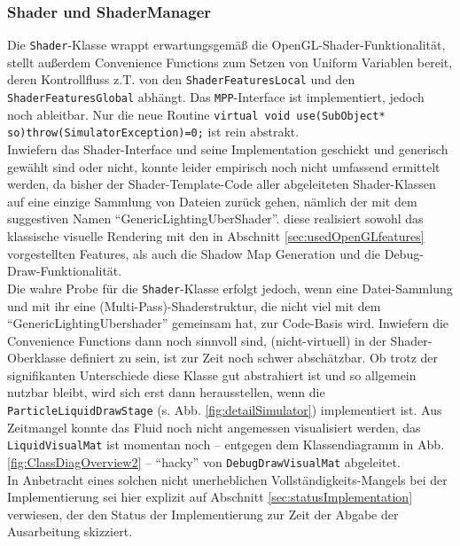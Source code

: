 	
	\subsubsection{Shader und ShaderManager}
	\label{sec:Shader}
		
		Die \lstinline|Shader|-Klasse wrappt erwartungsgemäß die OpenGL-Shader-Funktionalität,
		stellt außerdem Convenience Functions zum Setzen von Uniform Variablen bereit, deren Kontrollfluss
		z.T. von den \lstinline|ShaderFeaturesLocal| und den \lstinline|ShaderFeaturesGlobal| abhängt.
		Das \lstinline|MPP|-Interface ist implementiert, jedoch noch ableitbar.
		Nur die neue Routine  \lstinline|virtual void use(SubObject* so)throw(SimulatorException)=0;|
		ist rein abstrakt.\\
		
		Inwiefern das Shader-Interface und seine Implementation geschickt und generisch gewählt sind
		oder nicht, konnte leider empirisch noch nicht umfassend ermittelt werden, da bisher der
		Shader-Template-Code aller abgeleiteten
		Shader-Klassen auf eine einzige Sammlung von Dateien zurück gehen, nämlich der mit dem suggestiven Namen
		"`GenericLightingUberShader"'. diese realisiert sowohl das klassische visuelle Rendering mit den in Abschnitt
		\ref{sec:usedOpenGLfeatures} vorgestellten Features, als auch die Shadow Map Generation und die
		Debug-Draw-Funktionalität.\\
		Die wahre Probe für die \lstinline|Shader|-Klasse erfolgt jedoch, wenn eine Datei-Sammlung und mit ihr
		eine (Multi-Pass)-Shaderstruktur, die nicht viel mit dem "`GenericLightingUbershader"' gemeinsam hat,
		zur Code-Basis wird. Inwiefern die Convenience Functions dann noch sinnvoll sind,
		(nicht-virtuell) in der Shader-Oberklasse definiert zu sein, ist zur Zeit noch schwer abschätzbar.
		Ob trotz der signifikanten Unterschiede diese Klasse gut abstrahiert ist und so allgemein nutzbar bleibt,
		wird sich erst dann herausstellen, wenn die  \lstinline|ParticleLiquidDrawStage| 
		(s. Abb. \ref{fig:detailSimulator}) implementiert ist. 
		Aus Zeitmangel konnte das Fluid noch nicht angemessen visualisiert werden, das 
		\lstinline|LiquidVisualMat| ist momentan noch 
		-- entgegen dem Klassendiagramm in Abb. \ref{fig:ClassDiagOverview2} --
		"`hacky"' von \lstinline|DebugDrawVisualMat| abgeleitet.\\
		In Anbetracht eines solchen nicht unerheblichen Vollständigkeits-Mangels bei der Implementierung 
		sei hier explizit auf Abschnitt \ref{sec:statusImplementation} verwiesen, der den Status der Implementierung
		zur Zeit der Abgabe der Ausarbeitung skizziert.\\
	
